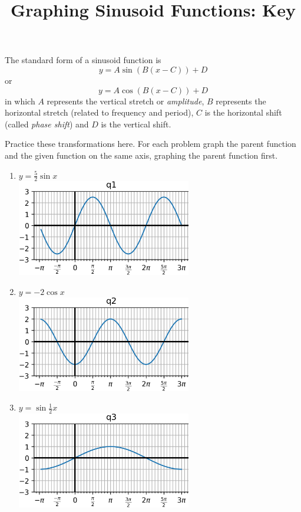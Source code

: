 \documentclass{article}
\begin{document}
\title{Graphing Sinusoid Functions: Key	}
\maketitle
\begin{multicols}{2}
The standard form of a sinusoid function is
$$ y = A \sin(B(x-C)) + D $$
or
$$ y = A \cos(B(x-C)) + D $$
in which $A$ represents the vertical stretch or
\textit{amplitude}, $B$ represents the horizontal stretch
(related to frequency and period), $C$ is the horizontal
shift (called \textit{phase shift}) and $D$ is the vertical shift.

Practice these transformations here. For each problem graph
the parent function and the given function on the same axis,
graphing the parent function first.

\begin{enumerate}
	\item $y=\frac52 \sin x$ \\
	\includegraphics*[width=3in]{q1.png}
	\item $y=-2 \cos x$ \\
	\includegraphics*[width=3in]{q2.png}
	\item $y=\sin \frac12 x$ \\
	\includegraphics*[width=3in]{q3.png}

\end{enumerate}
\end{multicols}
\end{document}
